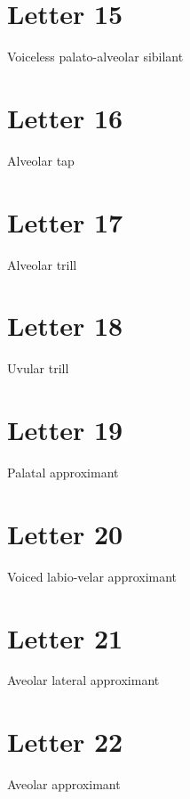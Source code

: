 \documentclass{book}
\newcommand{\letter}[1]{\begin{center}\resizebox{1cm}{!}{\texttt{[image: \#1]}}\end{center}}
\begin{document}
\letter{letters/consonants/14.JPG}


\section{Letter 15}
Voiceless palato-alveolar sibilant

\letter{letters/consonants/15.JPG}


\section{Letter 16}
Alveolar tap

\letter{letters/consonants/16.JPG}


\section{Letter 17}
Alveolar trill

\letter{letters/consonants/17.JPG}


\section{Letter 18}
Uvular trill

\letter{letters/consonants/18.JPG}


\section{Letter 19}
Palatal approximant

\letter{letters/consonants/19.JPG}


\section{Letter 20}
Voiced labio-velar approximant

\letter{letters/consonants/20.JPG}


\section{Letter 21}
Aveolar lateral approximant

\letter{letters/consonants/21.JPG}


\section{Letter 22}
Aveolar approximant

\letter{letters/consonants/22.JPG}
\end{document}
